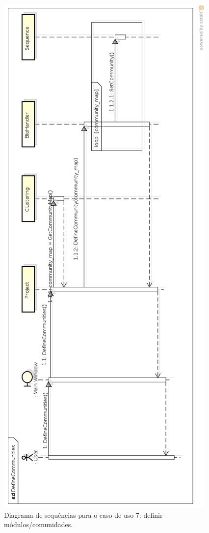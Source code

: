 \begin{figure}
\centering
\includegraphics[scale=0.41]{define-communities}
\caption{Diagrama de sequências para o caso de uso 7: definir módulos/comunidades.}
\label{fig:define-communities}
\end{figure}

